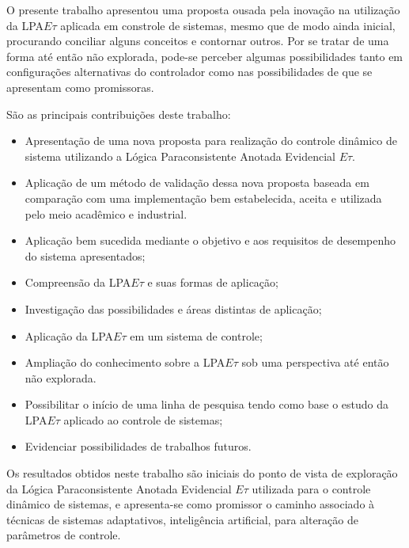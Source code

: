 O presente trabalho apresentou uma proposta ousada pela inovação na
utilização da LPA$E\tau$ aplicada em constrole de sistemas, mesmo que
de modo ainda inicial, procurando conciliar alguns conceitos e
contornar outros. Por se tratar de uma forma até então não
explorada, pode-se perceber algumas possibilidades
tanto em configurações alternativas do controlador como nas
possibilidades de que se apresentam como promissoras.


São as principais contribuições deste trabalho:

\begin{itemize}

\item Apresentação de uma nova proposta para realização do controle dinâmico de sistema utilizando a Lógica Paraconsistente Anotada Evidencial $E\tau$.

\item Aplicação de um método de validação dessa nova proposta baseada em comparação com uma implementação bem estabelecida, aceita e utilizada pelo meio acadêmico e industrial.

\item Aplicação bem sucedida mediante o objetivo e aos requisitos de desempenho do sistema apresentados;

\item Compreensão da LPA$E\tau$ e suas formas de aplicação;

\item Investigação das possibilidades e áreas distintas de aplicação;

\item Aplicação da LPA$E\tau$ em um sistema de controle;

\item Ampliação do conhecimento sobre a LPA$E\tau$ sob uma perspectiva até então não explorada.

\item Possibilitar o início de uma linha de pesquisa tendo como base o estudo da LPA$E\tau$ aplicado ao controle de sistemas;

\item Evidenciar possibilidades de trabalhos futuros.

\end{itemize}


Os resultados obtidos neste trabalho são iniciais do ponto de vista de exploração da Lógica Paraconsistente Anotada Evidencial $E\tau$ utilizada para o controle dinâmico de sistemas, e apresenta-se como promissor o caminho associado à técnicas de sistemas adaptativos, inteligência artificial, para alteração de parâmetros de controle.


